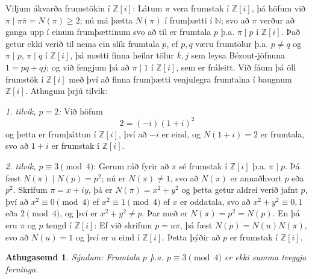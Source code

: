 \documentclass[a4paper,icelandic,11pt]{book}
\theoremstyle{plain}
\newtheorem*{ath}{Athugasemd}
\newcommand{\N}{\mathbb{N}}
\newcommand{\Z}{\mathbb{Z}}
\begin{document}
Viljum ákvarða frumstökin í $\Z[i]$: Látum $\pi$ vera frumstak í $\Z[i]$, þá
höfum við $\pi\mid\pi\overline\pi=N(\pi)\geq 2$; nú má þætta $N(\pi)$ í frumþætti í
$\N$; svo að $\pi$ verður að ganga upp í einum frumþættinum svo að til er
frumtala $p$ þ.a. $\pi\mid p$ í $\Z[i]$. Það getur ekki verið til nema ein slík
frumtala $p$, ef $p,q$ væru frumtölur þ.a. $p\neq q$ og $\pi\mid p$, $\pi\mid q$
í $\Z[i]$, þá mætti finna heilar tölur $k,j$ sem leysa Bézout-jöfnuna $1=pq+qj$;
og við fengjum þá að $\pi\mid 1$ í $\Z[i]$, sem er fráleitt. Við fáum þá öll
frumstök í $\Z[i]$ með því að finna frumþætti venjulegra frumtalna í baugnum
$\Z[i]$. Athugum þrjú tilvik:

\emph{1. tilvik, $p=2$:} Við höfum 
\[
2 = (-i)(1+i)^2
\]
og þetta er frumþáttun í $\Z[i]$, því að $-i$ er eind, og $N(1+i)=2$ er
frumtala, svo að $1+i$ er frumstak í $\Z[i]$.

\emph{2. tilvik, $p\equiv 3\pmod{4}$}: Gerum ráð fyrir að $\pi$ sé frumstak í
$\Z[i]$ þ.a. $\pi\mid p$. Þá fæst $N(\pi)\mid N(p) = p^2$; nú er $N(\pi)\neq 1$,
svo að $N(\pi)$ er annaðhvort $p$ eða $p^2$. Skrifum $\pi=x+iy$, þá er
$N(\pi)=x^2+y^2$ og þetta getur aldrei verið jafnt $p$, því að $x^2\equiv
0\pmod 4$ ef $x^2\equiv 1\pmod 4$ ef $x$ er oddatala, svo að $x^2+y^2 \equiv
0,1$ eða $2\pmod 4$, og því er $x^2+y^2 \neq p$. Þar með er $N(\pi)=p^2=N(p)$.
En þá eru $\pi$ og $p$ tengd í $\Z[i]$: Ef við skrifum $p = u\pi$, þá fæst
$N(p)=N(u)N(\pi)$, svo að $N(u)=1$ og því er $u$ eind í $\Z[i]$. Þetta þýðir að
$p$ er frumstak í $\Z[i]$.
\begin{ath}
  Sýndum: Frumtala $p$ þ.a. $p\equiv 3\pmod 4$ er ekki summa tveggja ferninga.
\end{ath}
\end{document}
